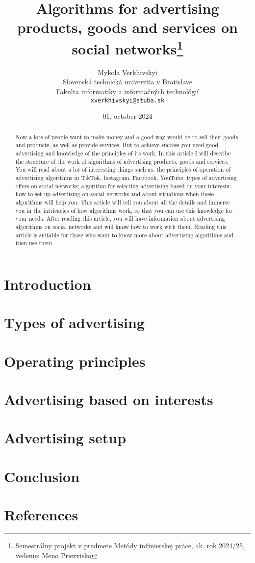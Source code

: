 \documentclass[10pt,twoside,slovak,a4paper]{article}
\title{Algorithms for advertising products, goods and services on social networks\thanks{Semestrálny projekt v predmete Metódy inžinierskej práce, ak. rok 2024/25, vedenie: Meno Priezvisko}} %
\author{Mykola Verkhivskyi\\[2pt]
	{\small Slovenská technická univerzita v Bratislave}\\
	{\small Fakulta informatiky a informačných technológií}\\
	{\small \texttt{xverkhivskyi@stuba.sk}}
	}
\date{\small 01. october 2024} %
\begin{document}
\maketitle

\begin{abstract}
Now a lots of people want to make money and a good way would be to sell their goods and products, as well as provide services. But to achieve success you need good advertising and knowledge of the principles of its work. In this article I will describe the structure of the work of algorithms of advertising products, goods and services. You will read about a lot of interesting things such as: the principles of operation of advertising algorithms in TikTok, Instagram, Facebook, YouTube; types of advertising offers on social networks; algorithm for selecting advertising based on your interests; how to set up advertising on social networks and about situations when these algorithms will help you. This article will tell you about all the details and immerse you in the intricacies of how algorithms work, so that you can use this knowledge for your needs. After reading this article, you will have information about advertising algorithms on social networks and will know how to work with them. Reading this article is suitable for those who want to know more about advertising algorithms and then use them.
\end{abstract}



\section{Introduction}
\section{Types of advertising} \label{ešte}
\section{Operating principles} \label{nejaka}
\section{Advertising based on interests} \label{ešte}
\section{Advertising setup} \label{ešte}
\section{Conclusion} \label{dolezitejsia}
\section{References} \label{zaver} %
\end{document}
